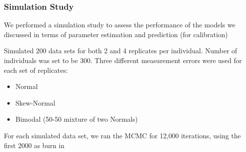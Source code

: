 \documentclass[handout]{beamer}\usepackage[]{graphicx}\usepackage[]{color}
\begin{document}
\begin{frame}
\frametitle{Simulation Study}
We performed a simulation study to assess the performance of the models we discussed in terms of parameter estimation and prediction (for calibration)

\vspace{0.2cm}

Simulated 200 data sets for both 2 and 4 replicates per individual. Number of individuals was set to be 300. Three different measurement errors were used for each set of replicates:

\begin{itemize}
\item
Normal
\item
Skew-Normal
\item
Bimodal (50-50 mixture of two Normals)
\end{itemize}

\vspace{0.2cm}

For each simulated data set, we ran the MCMC for 12,000 iterations, using the first 2000 as burn in

\end{frame}
\end{document}
